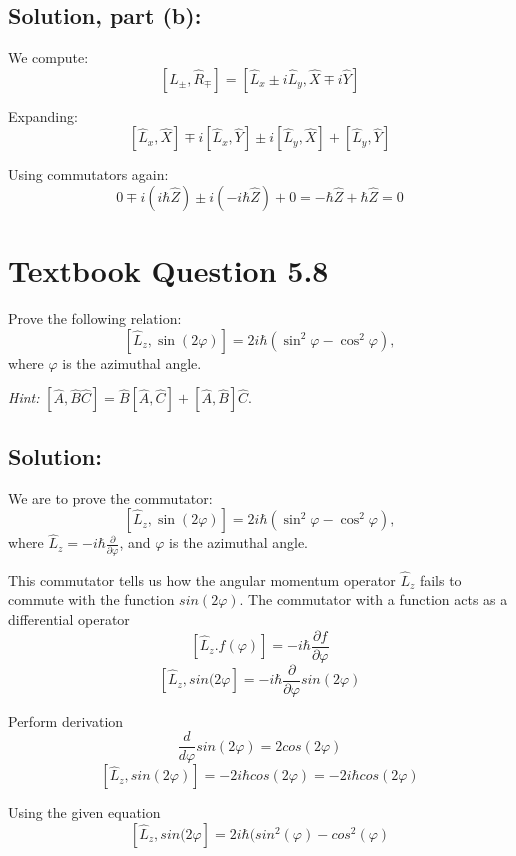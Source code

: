 \documentclass[12pt]{article}
\begin{document}
    \subsection{Solution, part (b):}
        We compute:
        \[
            [\hat{L}_\pm, \hat{R}_\mp] = [\hat{L}_x \pm i \hat{L}_y, \hat{X} \mp i \hat{Y}]
        \]

        Expanding:
        \[
            [\hat{L}_x, \hat{X}] \mp i[\hat{L}_x, \hat{Y}] \pm i[\hat{L}_y, \hat{X}] + [\hat{L}_y, \hat{Y}]
        \]

        Using commutators again:
        \[
            0 \mp i(i\hbar \hat{Z}) \pm i(-i\hbar \hat{Z}) + 0 = -\hbar \hat{Z} + \hbar \hat{Z} = \boxed{0}
        \]

\section{Textbook Question 5.8}
    Prove the following relation:
    \[
        [\hat{L}_z, \sin(2\varphi)] = 2i\hbar \left( \sin^2 \varphi - \cos^2 \varphi \right),
    \]
    where \( \varphi \) is the azimuthal angle. 

    \textit{Hint:} \( [\hat{A}, \hat{B} \hat{C}] = \hat{B} [\hat{A}, \hat{C}] + [\hat{A}, \hat{B}] \hat{C} \).

    \subsection{Solution:}
        We are to prove the commutator:
        \[
            [\hat{L}_z, \sin(2\varphi)] = 2i\hbar \left( \sin^2 \varphi - \cos^2 \varphi \right),
        \]
        where \( \hat{L}_z = -i\hbar \frac{\partial}{\partial \varphi} \), and \( \varphi \) is the azimuthal angle.

        This commutator tells us how the angular momentum operator $\hat{L}_z$ fails to commute with the function $sin(2\varphi)$. The commutator with a function acts as a differential operator
        \[
            [\hat{L}_z. f(\varphi)] = - i \hbar \frac{\partial f}{\partial \varphi}
        \]
        \[
            [\hat{L}_z, sin(2 \varphi] = - i \hbar \frac{\partial}{\partial \varphi} sin(2 \varphi)
        \]

        Perform derivation
        \[
            \frac{d}{d \varphi} sin(2 \varphi) = 2 cos(2 \varphi)
        \]
        \[
            [\hat{L}_z, sin(2 \varphi)] = - 2 i \hbar cos(2 \varphi) = - 2 i \hbar cos(2 \varphi)
        \]

        Using the given equation
        \[
            [\hat{L}_z, sin(2 \varphi] = 2 i \hbar (sin^2(\varphi) - cos^2(\varphi)
        \]
        
\end{document}
